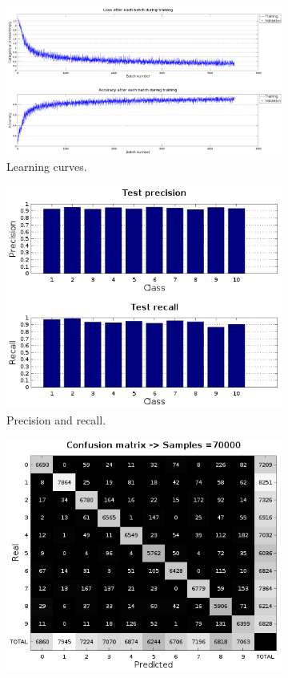 \begin{figure}
	\centering
	\begin{subfigure}{1\textwidth}
		\centering
		\includegraphics[width=1\linewidth]{figures/learning_curves.png}
		\caption{Learning curves.}
	\end{subfigure}
	\begin{subfigure}{0.5\textwidth}
		\centering
		\includegraphics[width=0.9\linewidth]{figures/prec_rec.png}
		\caption{Precision and recall.}
	\end{subfigure}%
	\begin{subfigure}{0.5\textwidth}
		\centering
		\includegraphics[width=0.9\linewidth]{figures/conf_mat.png}

\end{subfigure}
\end{figure}
